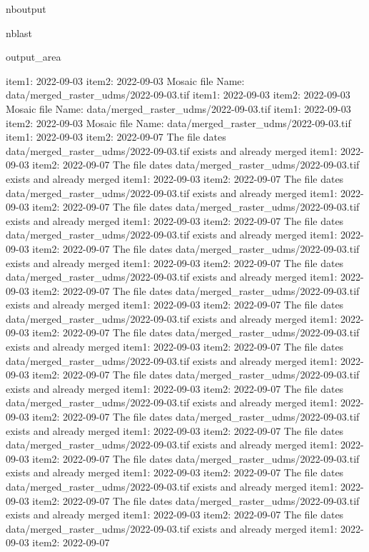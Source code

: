 \documentclass[letterpaper,10pt]{sphinxmanual}
\begin{document}
\begin{sphinxuseclass}{nboutput}
\begin{sphinxuseclass}{nblast}
{\begin{sphinxuseclass}{output_area}
\begin{sphinxuseclass}{}
\begin{sphinxVerbatim}[commandchars=\\\{\}]
item1:  2022-09-03
item2:  2022-09-03
Mosaic file Name:  data/merged\_raster\_udms/2022-09-03.tif
item1:  2022-09-03
item2:  2022-09-03
Mosaic file Name:  data/merged\_raster\_udms/2022-09-03.tif
item1:  2022-09-03
item2:  2022-09-03
Mosaic file Name:  data/merged\_raster\_udms/2022-09-03.tif
item1:  2022-09-03
item2:  2022-09-07
The file dates data/merged\_raster\_udms/2022-09-03.tif exists and already merged
item1:  2022-09-03
item2:  2022-09-07
The file dates data/merged\_raster\_udms/2022-09-03.tif exists and already merged
item1:  2022-09-03
item2:  2022-09-07
The file dates data/merged\_raster\_udms/2022-09-03.tif exists and already merged
item1:  2022-09-03
item2:  2022-09-07
The file dates data/merged\_raster\_udms/2022-09-03.tif exists and already merged
item1:  2022-09-03
item2:  2022-09-07
The file dates data/merged\_raster\_udms/2022-09-03.tif exists and already merged
item1:  2022-09-03
item2:  2022-09-07
The file dates data/merged\_raster\_udms/2022-09-03.tif exists and already merged
item1:  2022-09-03
item2:  2022-09-07
The file dates data/merged\_raster\_udms/2022-09-03.tif exists and already merged
item1:  2022-09-03
item2:  2022-09-07
The file dates data/merged\_raster\_udms/2022-09-03.tif exists and already merged
item1:  2022-09-03
item2:  2022-09-07
The file dates data/merged\_raster\_udms/2022-09-03.tif exists and already merged
item1:  2022-09-03
item2:  2022-09-07
The file dates data/merged\_raster\_udms/2022-09-03.tif exists and already merged
item1:  2022-09-03
item2:  2022-09-07
The file dates data/merged\_raster\_udms/2022-09-03.tif exists and already merged
item1:  2022-09-03
item2:  2022-09-07
The file dates data/merged\_raster\_udms/2022-09-03.tif exists and already merged
item1:  2022-09-03
item2:  2022-09-07
The file dates data/merged\_raster\_udms/2022-09-03.tif exists and already merged
item1:  2022-09-03
item2:  2022-09-07
The file dates data/merged\_raster\_udms/2022-09-03.tif exists and already merged
item1:  2022-09-03
item2:  2022-09-07
The file dates data/merged\_raster\_udms/2022-09-03.tif exists and already merged
item1:  2022-09-03
item2:  2022-09-07
The file dates data/merged\_raster\_udms/2022-09-03.tif exists and already merged
item1:  2022-09-03
item2:  2022-09-07
The file dates data/merged\_raster\_udms/2022-09-03.tif exists and already merged
item1:  2022-09-03
item2:  2022-09-07
The file dates data/merged\_raster\_udms/2022-09-03.tif exists and already merged
item1:  2022-09-03
item2:  2022-09-07
The file dates data/merged\_raster\_udms/2022-09-03.tif exists and already merged
item1:  2022-09-03
item2:  2022-09-07

\end{sphinxVerbatim}
\end{sphinxuseclass}
\end{sphinxuseclass}}
\end{sphinxuseclass}
\end{sphinxuseclass}
\end{document}
